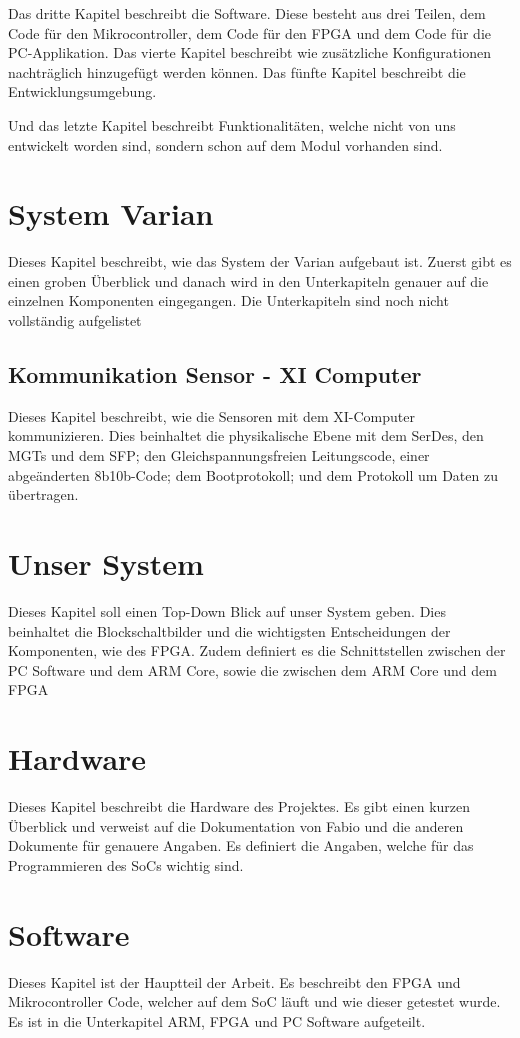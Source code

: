 \documentclass{article}
\begin{document}
Das dritte Kapitel beschreibt die Software. Diese besteht aus drei Teilen, dem Code für den Mikrocontroller, dem Code für den FPGA und dem Code für die PC-Applikation.
Das vierte Kapitel beschreibt wie zusätzliche Konfigurationen nachträglich hinzugefügt werden können.
Das fünfte Kapitel beschreibt die Entwicklungsumgebung.

Und das letzte Kapitel beschreibt Funktionalitäten, welche nicht von uns entwickelt worden sind, sondern schon auf dem Modul vorhanden sind.

\section{System Varian}
Dieses Kapitel beschreibt, wie das System der Varian aufgebaut ist. Zuerst gibt es einen groben Überblick und danach wird in den Unterkapiteln genauer auf die einzelnen Komponenten eingegangen. Die Unterkapiteln sind noch nicht vollständig aufgelistet
\subsection{Kommunikation Sensor - XI Computer}
Dieses Kapitel beschreibt, wie die Sensoren mit dem XI-Computer kommunizieren. Dies beinhaltet die physikalische Ebene mit dem SerDes, den MGTs und dem SFP; den Gleichspannungsfreien Leitungscode, einer abgeänderten 8b10b-Code; dem Bootprotokoll; und dem Protokoll um Daten zu übertragen.

\section{Unser System}
Dieses Kapitel soll einen Top-Down Blick auf unser System geben. Dies beinhaltet die Blockschaltbilder und die wichtigsten Entscheidungen der Komponenten, wie des FPGA. Zudem definiert es die Schnittstellen zwischen der PC Software und dem ARM Core, sowie die zwischen dem ARM Core und dem FPGA

\section{Hardware}
Dieses Kapitel beschreibt die Hardware des Projektes. Es gibt einen kurzen Überblick und verweist auf die Dokumentation von Fabio und die anderen Dokumente für genauere Angaben. Es definiert die Angaben, welche für das Programmieren des SoCs wichtig sind.

\section{Software}
Dieses Kapitel ist der Hauptteil der Arbeit. Es beschreibt den FPGA und Mikrocontroller Code, welcher auf dem SoC läuft und wie dieser getestet wurde. Es ist in die Unterkapitel ARM, FPGA und PC Software aufgeteilt.
\end{document}
